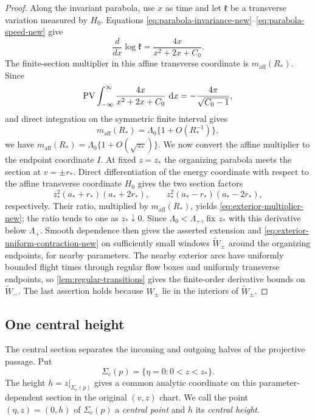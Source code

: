 \begin{proof}
Along the invariant parabola, use $x$ as time and let $\mathfrak k$ be a transverse
variation measured by $H_0$.  Equations
\eqref{eq:parabola-invariance-new}--\eqref{eq:parabola-speed-new} give
\[
 \frac{d}{dx}\log\mathfrak k
 =\frac{4x}{x^2+2x+C_0}.
\]
The finite-section multiplier in this affine transverse coordinate is
$m_{\mathrm{aff}}(R_*)$.  Since
\[
 \operatorname{PV}\int_{-\infty}^{\infty}
 \frac{4x}{x^2+2x+C_0}\,\,\mathrm d x
 =-\frac{4\pi}{\sqrt{C_0-1}},
\]
and direct integration on the symmetric finite interval gives
\[
 m_{\mathrm{aff}}(R_*)
 =\Lambda_0\{1+O(R_*^{-1})\},
\]
we have $m_{\mathrm{aff}}(R_*)=\Lambda_0\{1+O(\sqrt{z_*})\}$.
We now convert the affine multiplier to the endpoint coordinate \(I\).
At fixed $z=z_*$ the organizing parabola meets the section at $v=\pm r_*$.
Direct differentiation of the
energy coordinate with respect to the affine transverse coordinate $H_0$
gives the two section factors
\[
 z_*^2(a_*+r_*)(a_*+2r_*),\qquad
 z_*^2(a_*-r_*)(a_*-2r_*),
\]
respectively.  Their ratio, multiplied by $m_{\mathrm{aff}}(R_*)$, yields
\eqref{eq:exterior-multiplier-new}; the ratio tends to one as
$z_*\downarrow0$.
Since $\Lambda_0<\Lambda_+$, fix $z_*$ with this derivative below
\(\Lambda_+\). Smooth dependence then gives the asserted extension and
\eqref{eq:exterior-uniform-contraction-new} on sufficiently small
windows \(\widetilde W_\pm\) around the organizing endpoints, for nearby
parameters. The nearby
exterior arcs have uniformly bounded flight times through regular flow
boxes and uniformly transverse endpoints, so
\cref{lem:regular-transitions} gives the finite-order derivative bounds
on \(\widetilde W_-\). The last assertion holds because \(W_\pm\) lie in
the interiors of \(\widetilde W_\pm\).
\end{proof}

\subsection{One central height}

The central section separates the incoming and outgoing halves of the
projective passage. Put
\begin{equation}
\label{eq:central-section-new}
 \Sigma_c(p)=\{\eta=0:0<z<z_*\}.
\end{equation}
The height $h=z|_{\Sigma_c(p)}$ gives a common analytic coordinate on
this parameter-dependent section in the original $(v,z)$ chart.
We call the point
$(\eta,z)=(0,h)$ of $\Sigma_c(p)$ a \emph{central point} and $h$ its
\emph{central height}.


